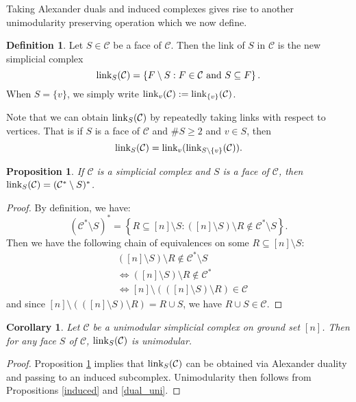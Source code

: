 \documentclass[letterpaper,12pt]{amsart}
\theoremstyle{plain}
\newtheorem{prop}[thm]{Proposition}
\newtheorem{cor}[thm]{Corollary}
\theoremstyle{definition}
\newtheorem{defn}[thm]{Definition}
\theoremstyle{remark}
\newcommand{\calc}{\mathcal{C}}
\newcommand{\link}{\textnormal{link}}
\begin{document}
Taking Alexander duals and induced complexes gives rise to another unimodularity preserving operation which we now define.
\begin{defn}
	Let $S  \in \mathcal{C}$ be a face of $\calc$.
	Then the link of $S$ in $\mathcal{C}$ is the new simplicial complex
	\[
		\link_S( \mathcal{C} ) = \left\{F\setminus S : F \in \mathcal{C} \mbox{ and } S \subseteq F \right\}.
	\]
	When $S = \{v\}$, we simply write $\link_v(\mathcal{C}) := \link_{\{v\}}( \calc)$.
\end{defn}

Note that we can obtain $\link_S(\mathcal{C})$ by repeatedly taking links with respect to vertices.
That is if $S$ is a face of $\calc$ and  $\#S \ge 2$ and $v \in S$, then
\[
	\link_S(\mathcal{C}) = \link_{v}(\link_{S\setminus\{v\}}(\mathcal{C})).
\]

\begin{prop}\label{linkdual}
	If $\mathcal{C}$ is a simplicial complex and $S$ is a face of $\calc$, 
	then $\link_S(\mathcal{C}) = (\mathcal{C}^*\setminus S)^*$. \qedhere
\end{prop}

\begin{proof}
	By definition, we have:
	\[
		(\mathcal{C}^*\setminus S)^* = \left\{R \subseteq [n] \setminus S : \left([n]\setminus S\right) \setminus R \notin \mathcal{C}^*\setminus S \right\}.
	\]
	Then we have the following chain of equivalences on some $R \subseteq [n] \setminus S$:
	\begin{align*}
		&([n] \setminus S)\setminus R \notin \mathcal{C}^*\setminus S
		\\&\iff ([n] \setminus S)\setminus R \notin \mathcal{C}^*
		\\&\iff [n] \setminus \left(([n] \setminus S)\setminus R\right) \in \mathcal{C}
	\end{align*}
	and since $[n] \setminus \left(([n] \setminus S)\setminus R\right) = R \cup S$, we have $R \cup S \in \mathcal{C}$.
\end{proof}


\begin{cor}\label{link}
	Let $\mathcal{C}$ be a unimodular simplicial complex on ground set $[n]$.
	Then for any face $S$ of $\calc$, $\link_S( \mathcal{C} )$ is unimodular.
\end{cor}

\begin{proof}
    Proposition \ref{linkdual} implies that $\link_S( \mathcal{C} )$  can be obtained
    via Alexander duality and passing to an induced subcomplex.
	Unimodularity then follows from Propositions \ref{induced} and \ref{dual_uni}.
\end{proof}
\end{document}
